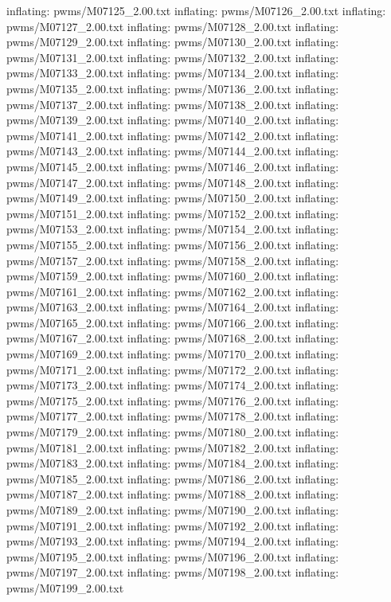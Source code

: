 \documentclass[letterpaper,10pt,english]{sphinxmanual}
\begin{document}
{\begin{sphinxVerbatim}[commandchars=\\\{\}]
  inflating: pwms/M07125\_2.00.txt
  inflating: pwms/M07126\_2.00.txt
  inflating: pwms/M07127\_2.00.txt
  inflating: pwms/M07128\_2.00.txt
  inflating: pwms/M07129\_2.00.txt
  inflating: pwms/M07130\_2.00.txt
  inflating: pwms/M07131\_2.00.txt
  inflating: pwms/M07132\_2.00.txt
  inflating: pwms/M07133\_2.00.txt
  inflating: pwms/M07134\_2.00.txt
  inflating: pwms/M07135\_2.00.txt
  inflating: pwms/M07136\_2.00.txt
  inflating: pwms/M07137\_2.00.txt
  inflating: pwms/M07138\_2.00.txt
  inflating: pwms/M07139\_2.00.txt
  inflating: pwms/M07140\_2.00.txt
  inflating: pwms/M07141\_2.00.txt
  inflating: pwms/M07142\_2.00.txt
  inflating: pwms/M07143\_2.00.txt
  inflating: pwms/M07144\_2.00.txt
  inflating: pwms/M07145\_2.00.txt
  inflating: pwms/M07146\_2.00.txt
  inflating: pwms/M07147\_2.00.txt
  inflating: pwms/M07148\_2.00.txt
  inflating: pwms/M07149\_2.00.txt
  inflating: pwms/M07150\_2.00.txt
  inflating: pwms/M07151\_2.00.txt
  inflating: pwms/M07152\_2.00.txt
  inflating: pwms/M07153\_2.00.txt
  inflating: pwms/M07154\_2.00.txt
  inflating: pwms/M07155\_2.00.txt
  inflating: pwms/M07156\_2.00.txt
  inflating: pwms/M07157\_2.00.txt
  inflating: pwms/M07158\_2.00.txt
  inflating: pwms/M07159\_2.00.txt
  inflating: pwms/M07160\_2.00.txt
  inflating: pwms/M07161\_2.00.txt
  inflating: pwms/M07162\_2.00.txt
  inflating: pwms/M07163\_2.00.txt
  inflating: pwms/M07164\_2.00.txt
  inflating: pwms/M07165\_2.00.txt
  inflating: pwms/M07166\_2.00.txt
  inflating: pwms/M07167\_2.00.txt
  inflating: pwms/M07168\_2.00.txt
  inflating: pwms/M07169\_2.00.txt
  inflating: pwms/M07170\_2.00.txt
  inflating: pwms/M07171\_2.00.txt
  inflating: pwms/M07172\_2.00.txt
  inflating: pwms/M07173\_2.00.txt
  inflating: pwms/M07174\_2.00.txt
  inflating: pwms/M07175\_2.00.txt
  inflating: pwms/M07176\_2.00.txt
  inflating: pwms/M07177\_2.00.txt
  inflating: pwms/M07178\_2.00.txt
  inflating: pwms/M07179\_2.00.txt
  inflating: pwms/M07180\_2.00.txt
  inflating: pwms/M07181\_2.00.txt
  inflating: pwms/M07182\_2.00.txt
  inflating: pwms/M07183\_2.00.txt
  inflating: pwms/M07184\_2.00.txt
  inflating: pwms/M07185\_2.00.txt
  inflating: pwms/M07186\_2.00.txt
  inflating: pwms/M07187\_2.00.txt
  inflating: pwms/M07188\_2.00.txt
  inflating: pwms/M07189\_2.00.txt
  inflating: pwms/M07190\_2.00.txt
  inflating: pwms/M07191\_2.00.txt
  inflating: pwms/M07192\_2.00.txt
  inflating: pwms/M07193\_2.00.txt
  inflating: pwms/M07194\_2.00.txt
  inflating: pwms/M07195\_2.00.txt
  inflating: pwms/M07196\_2.00.txt
  inflating: pwms/M07197\_2.00.txt
  inflating: pwms/M07198\_2.00.txt
  inflating: pwms/M07199\_2.00.txt

\end{sphinxVerbatim}}
\end{document}
